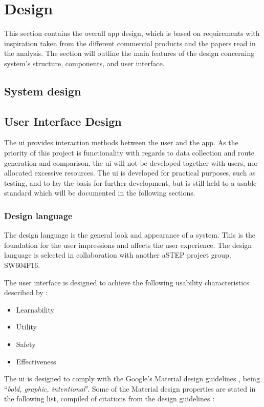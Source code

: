 \section{Design}\label{sprint1design}
This section contains the overall app design, which is based on requirements with inspiration taken from the different commercial products and the papers read in the analysis.
The section will outline the main features of the design concerning system's structure, components, and user interface.

\subsection{System design}


\subsection{User Interface Design}
The \gls{ui} provides interaction methods between the user and the app.
As the priority of this project is functionality with regards to data collection and route generation and comparison, the \gls{ui} will not be developed together with users, nor allocated excessive resources. 
The \gls{ui} is developed for practical purposes, such as testing, and to lay the basis for further development, but is still held to a usable standard which will be documented in the following sections. 

\subsubsection{Design language}
The design language is the general look and appearance of a system.
This is the foundation for the user impressions and affects the user experience.
The design language is selected in collaboration with another aSTEP project group, SW604F16.

The user interface is designed to achieve the following usability characteristics described by \citet{DIS2014}:
\begin{itemize}
	\item Learnability
	\item Utility
	\item Safety
	\item Effectiveness
\end{itemize}

The \gls{ui} is designed to comply with the Google's Material design guidelines \cite{materialDesign}, being ``\textit{bold, graphic, intentional}''. 
Some of the Material design properties are stated in the following list, compiled of citations from the design guidelines \cite{materialProperties}:

